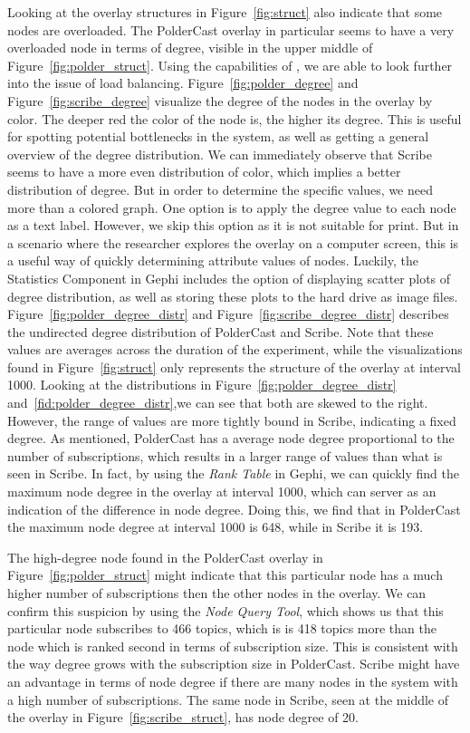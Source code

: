 Looking at the overlay structures in Figure~\ref{fig:struct} also
indicate that some nodes are overloaded. The PolderCast overlay in
particular seems to have a very overloaded node in terms of degree,
visible in the upper middle of Figure~\ref{fig:polder_struct}. Using the
capabilities of \demo{}, we are able to look further into the issue of
load balancing. Figure~\ref{fig:polder_degree} and
Figure~\ref{fig:scribe_degree} visualize the degree of the nodes in the
overlay by color. The deeper red the color of the node is, the higher
its degree. This is useful for spotting potential bottlenecks in the
system, as well as getting a general overview of the degree
distribution. We can immediately observe that Scribe seems to have a
more even distribution of color, which implies a better distribution of
degree. But in order to determine the specific values, we need more than
a colored graph. One option is to apply the degree value to each node as
a text label. However, we skip this option as it is not suitable for
print. But in a scenario where the researcher explores the overlay on a
computer screen, this is a useful way of quickly determining attribute
values of nodes. Luckily, the Statistics Component in Gephi includes the
option of displaying scatter plots of degree distribution, as well as
storing these plots to the hard drive as image files.
Figure~\ref{fig:polder_degree_distr} and
Figure~\ref{fig:scribe_degree_distr} describes the undirected degree
distribution of PolderCast and Scribe. Note that these values are
averages across the duration of the experiment, while the visualizations
found in Figure~\ref{fig:struct} only represents the structure of the
overlay at interval 1000. Looking at the distributions in
Figure~\ref{fig:polder_degree_distr}
and~\ref{fid:polder_degree_distr},we can see that both are skewed to the
right. However, the range of values are more tightly bound in Scribe,
indicating a fixed degree. As mentioned, PolderCast has a average node
degree proportional to the number of subscriptions, which results in a
larger range of values than what is seen in Scribe. In fact, by using
the \emph{Rank Table} in Gephi, we can quickly find the maximum node
degree in the overlay at interval 1000, which can server as an
indication of the difference in node degree. Doing this, we find that in
PolderCast the maximum node degree at interval 1000 is 648, while in
Scribe it is 193.

The high-degree node found in the PolderCast overlay in
Figure~\ref{fig:polder_struct} might indicate that this particular node
has a much higher number of subscriptions then the other nodes in the
overlay. We can confirm this suspicion by using the \emph{Node Query
    Tool}, which shows us that this particular node subscribes to 466
topics, which is is 418 topics more than the node which is ranked second
in terms of subscription size. This is consistent with the way degree
grows with the subscription size in PolderCast. Scribe might have an
advantage in terms of node degree if there are many nodes in the system
with a high number of subscriptions. The same node in Scribe, seen at
the middle of the overlay in Figure~\ref{fig:scribe_struct}, has node
degree of 20.


